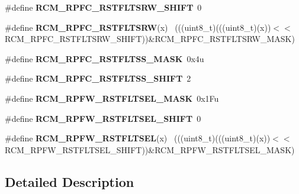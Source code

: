 \begin{DoxyCompactItemize}
\item 
\hypertarget{group___r_c_m___register___masks_gad869b7629ba10023abe459d7293fd281}{}\#define {\bfseries R\+C\+M\+\_\+\+R\+P\+F\+C\+\_\+\+R\+S\+T\+F\+L\+T\+S\+R\+W\+\_\+\+S\+H\+I\+F\+T}~0\label{group___r_c_m___register___masks_gad869b7629ba10023abe459d7293fd281}

\item 
\hypertarget{group___r_c_m___register___masks_ga3ca72ed675321a6b8939c43f1616ecc6}{}\#define {\bfseries R\+C\+M\+\_\+\+R\+P\+F\+C\+\_\+\+R\+S\+T\+F\+L\+T\+S\+R\+W}(x)                                    ~(((uint8\+\_\+t)(((uint8\+\_\+t)(x))$<$$<$R\+C\+M\+\_\+\+R\+P\+F\+C\+\_\+\+R\+S\+T\+F\+L\+T\+S\+R\+W\+\_\+\+S\+H\+I\+F\+T))\&R\+C\+M\+\_\+\+R\+P\+F\+C\+\_\+\+R\+S\+T\+F\+L\+T\+S\+R\+W\+\_\+\+M\+A\+S\+K)\label{group___r_c_m___register___masks_ga3ca72ed675321a6b8939c43f1616ecc6}

\item 
\hypertarget{group___r_c_m___register___masks_gadfb0f8132fbbc978c9756a2adfbf2ed0}{}\#define {\bfseries R\+C\+M\+\_\+\+R\+P\+F\+C\+\_\+\+R\+S\+T\+F\+L\+T\+S\+S\+\_\+\+M\+A\+S\+K}~0x4u\label{group___r_c_m___register___masks_gadfb0f8132fbbc978c9756a2adfbf2ed0}

\item 
\hypertarget{group___r_c_m___register___masks_ga4c39eb26fa537bf5e4e6b0ea82ffaeb2}{}\#define {\bfseries R\+C\+M\+\_\+\+R\+P\+F\+C\+\_\+\+R\+S\+T\+F\+L\+T\+S\+S\+\_\+\+S\+H\+I\+F\+T}~2\label{group___r_c_m___register___masks_ga4c39eb26fa537bf5e4e6b0ea82ffaeb2}

\item 
\hypertarget{group___r_c_m___register___masks_ga60f29f78d245476ae9716d81b5728739}{}\#define {\bfseries R\+C\+M\+\_\+\+R\+P\+F\+W\+\_\+\+R\+S\+T\+F\+L\+T\+S\+E\+L\+\_\+\+M\+A\+S\+K}~0x1\+Fu\label{group___r_c_m___register___masks_ga60f29f78d245476ae9716d81b5728739}

\item 
\hypertarget{group___r_c_m___register___masks_ga489d9757284af48af000b769d36bf21a}{}\#define {\bfseries R\+C\+M\+\_\+\+R\+P\+F\+W\+\_\+\+R\+S\+T\+F\+L\+T\+S\+E\+L\+\_\+\+S\+H\+I\+F\+T}~0\label{group___r_c_m___register___masks_ga489d9757284af48af000b769d36bf21a}

\item 
\hypertarget{group___r_c_m___register___masks_gaed8a9ebad93d9ea2a3b3a827890f983d}{}\#define {\bfseries R\+C\+M\+\_\+\+R\+P\+F\+W\+\_\+\+R\+S\+T\+F\+L\+T\+S\+E\+L}(x)                                    ~(((uint8\+\_\+t)(((uint8\+\_\+t)(x))$<$$<$R\+C\+M\+\_\+\+R\+P\+F\+W\+\_\+\+R\+S\+T\+F\+L\+T\+S\+E\+L\+\_\+\+S\+H\+I\+F\+T))\&R\+C\+M\+\_\+\+R\+P\+F\+W\+\_\+\+R\+S\+T\+F\+L\+T\+S\+E\+L\+\_\+\+M\+A\+S\+K)\label{group___r_c_m___register___masks_gaed8a9ebad93d9ea2a3b3a827890f983d}

\end{DoxyCompactItemize}


\subsection{Detailed Description}
